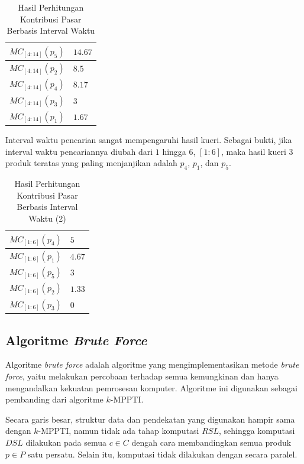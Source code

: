 \begin{table}[H]
	\small
	\centering
	\begin{tabular}{|p{3cm}|p{2cm}|}
		\hline
		$MC_{[4:14]}(p_5)$ & $14.67$ \\ \hline
		$MC_{[4:14]}(p_2)$ & $8.5$ \\ \hline
		$MC_{[4:14]}(p_4)$ & $8.17$ \\ \hline
		$MC_{[4:14]}(p_3)$ & $3$ \\ \hline
		$MC_{[4:14]}(p_1)$ & $1.67$ \\ \hline
	\end{tabular} 
	\caption{Hasil Perhitungan Kontribusi Pasar Berbasis Interval Waktu}
	\label{tab:mc-ti-res}
\end{table}

Interval waktu pencarian sangat mempengaruhi hasil kueri. Sebagai bukti, jika interval waktu pencariannya diubah dari $1$ hingga $6$, $[1:6]$, maka hasil kueri $3$ produk teratas yang paling menjanjikan adalah $p_4$, $p_1$, dan $p_5$.

\begin{table}[H]
	\small
	\centering
	\begin{tabular}{|p{3cm}|p{2cm}|}
		\hline
		$MC_{[1:6]}(p_4)$ & $5$ \\ \hline
		$MC_{[1:6]}(p_1)$ & $4.67$ \\ \hline
		$MC_{[1:6]}(p_5)$ & $3$ \\ \hline
		$MC_{[1:6]}(p_2)$ & $1.33$ \\ \hline
		$MC_{[1:6]}(p_3)$ & $0$ \\ \hline
	\end{tabular} 
	\caption{Hasil Perhitungan Kontribusi Pasar Berbasis Interval Waktu (2)}
	\label{tab:mc-ti-res2}
\end{table}


\subsection{Algoritme \textit{Brute Force}}
\tab Algoritme \textit{brute force} adalah algoritme yang mengimplementasikan metode \textit{brute force}, yaitu melakukan percobaan terhadap semua kemungkinan dan hanya mengandalkan kekuatan pemrosesan komputer. Algoritme ini digunakan sebagai pembanding dari algoritme $k$-MPPTI.

Secara garis besar, struktur data dan pendekatan yang digunakan hampir sama dengan $k$-MPPTI, namun tidak ada tahap komputasi $RSL$, sehingga komputasi $DSL$ dilakukan pada semua $c \in C$ dengah cara membandingkan semua produk $p \in P$ satu persatu. Selain itu, komputasi tidak dilakukan dengan secara paralel. 


